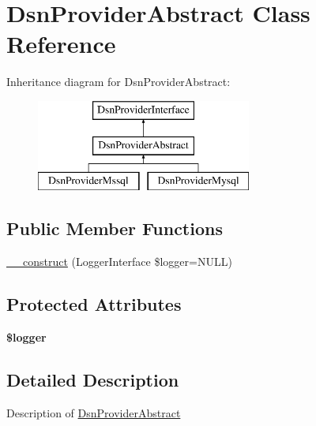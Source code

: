 \hypertarget{class_pes_1_1_database_1_1_handler_1_1_dsn_provider_1_1_dsn_provider_abstract}{}\section{Dsn\+Provider\+Abstract Class Reference}
\label{class_pes_1_1_database_1_1_handler_1_1_dsn_provider_1_1_dsn_provider_abstract}
Inheritance diagram for Dsn\+Provider\+Abstract\+:\begin{figure}[H]
\begin{center}
\leavevmode
\includegraphics[height=3.000000cm]{class_pes_1_1_database_1_1_handler_1_1_dsn_provider_1_1_dsn_provider_abstract}
\end{center}
\end{figure}
\subsection*{Public Member Functions}
\begin{DoxyCompactItemize}
\item 
\mbox{\hyperlink{class_pes_1_1_database_1_1_handler_1_1_dsn_provider_1_1_dsn_provider_abstract_a4d086b03f47931c183f0414bf2da5103}{\+\_\+\+\_\+construct}} (Logger\+Interface \$logger=N\+U\+LL)
\end{DoxyCompactItemize}
\subsection*{Protected Attributes}
\begin{DoxyCompactItemize}
\item 
\mbox{\label{class_pes_1_1_database_1_1_handler_1_1_dsn_provider_1_1_dsn_provider_abstract_aebfec76216371ef236acc5910e90933d}} 
{\bfseries \$logger}
\end{DoxyCompactItemize}


\subsection{Detailed Description}
Description of \mbox{\hyperlink{class_pes_1_1_database_1_1_handler_1_1_dsn_provider_1_1_dsn_provider_abstract}{Dsn\+Provider\+Abstract}}

